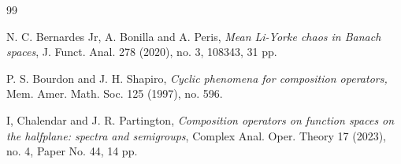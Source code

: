 \documentclass[11pt]{amsart}%
\numberwithin{equation}{section}
\theoremstyle{plain}
\theoremstyle{definition}
\theoremstyle{definition}
\begin{document}
\begin{thebibliography}{99}
	
		
		



        
		
		
		
		
		
	
	
	
 N. C. Bernardes Jr, A. Bonilla and A. Peris, 
\emph{Mean Li-Yorke chaos in Banach spaces},
J. Funct. Anal. 278 (2020), no. 3, 108343, 31 pp.

 P. S. Bourdon and J. H. Shapiro, \emph{Cyclic phenomena for composition operators,} Mem. Amer. Math. Soc. 125 (1997), no. 596.




 I, Chalendar and J. R. Partington, \emph{
Composition operators on function spaces on the halfplane: spectra and semigroups},
Complex Anal. Oper. Theory 17 (2023), no. 4, Paper No. 44, 14 pp.


\end{thebibliography}
\end{document}
